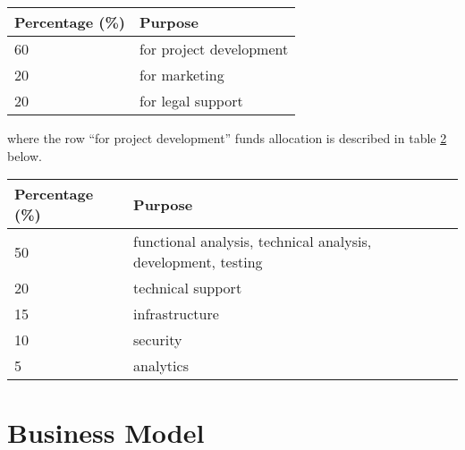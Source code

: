 \documentclass[11pt,fleqn,oneside]{book} %
\begin{document}
\vspace{5mm}
\begin{table}[H]
	\centering
	\begin{tabular}{l l}
		\toprule
		\textbf{Percentage (\%)} & \textbf{Purpose} \\
		\midrule
		60		& for project development	\\
		20		& for marketing	\\
		20		& for legal support	\\
		\bottomrule
	\end{tabular}
	\label{tab:division}
\end{table}

\vspace{5mm}
where the row ``for project development'' funds allocation is described in table \ref{tab:focus} below.

\vspace{5mm}
\begin{table}[H]
	\centering
	\begin{tabular}{l l}
		\toprule
		\textbf{Percentage (\%)} & \textbf{Purpose} \\
		\midrule
		50		& functional analysis, technical analysis, development, testing	\\
		20		& technical support	\\
		15		& infrastructure	\\
		10		& security	\\
		5		& analytics	\\
		\bottomrule
	\end{tabular}
	\label{tab:focus}
\end{table}



\chapter{Business Model}
\end{document}
